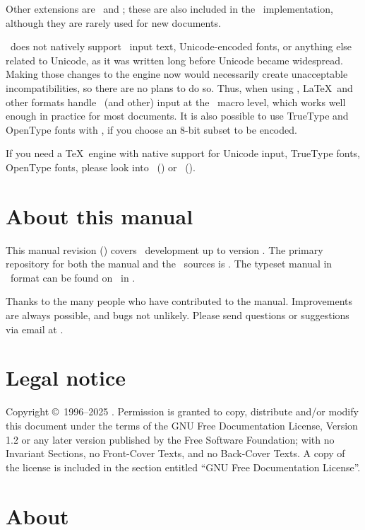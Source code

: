 \documentclass{pdftexmanual}
\begin{document}
Other extensions are \MLTEX\ and \ENCTEX; these are also included in the
\PDFTEX\ implementation, although they are rarely used for new documents.

\PDFTEX\ does not natively support \UTFEIGHT\ input text,
Unicode-encoded fonts, or anything else related to Unicode, as it was
written long before Unicode became widespread. Making those changes to
the engine now would necessarily create unacceptable incompatibilities,
so there are no plans to do so. Thus, when using \PDFTEX, \LaTeX\ and
other formats handle \UTFEIGHT\ (and other) input at the \TEX\ macro
level, which works well enough in practice for most documents. It is
also possible to use TrueType and OpenType fonts with \PDFTEX, if you
choose an 8-bit subset to be encoded.

If you need a \TeX\ engine with native support for Unicode input,
TrueType fonts, OpenType fonts, please look into \LUATEX\
() or \XETEX\ ().

\section{About this manual}

This manual revision (\rcsrevision) covers \PDFTEX\ development up to
version \currentpdftex. The primary repository for both the manual and
the \PDFTEX\ sources is \useurl{ptexdevel}. The typeset manual in \PDF\
format can be found on \CTAN\ in .

Thanks to the many people who have contributed to the manual.
Improvements are always possible, and bugs not unlikely.
Please send questions or suggestions via email at .

\section{Legal notice}

Copyright \copyright\ 1996--2025 \THANH.
Permission is granted to copy, distribute and/or modify this document
under the terms of the GNU Free Documentation License, Version 1.2
or any later version published by the Free Software Foundation;
with no Invariant Sections, no Front-Cover Texts, and no Back-Cover Texts.
A copy of the license is included in the section entitled ``GNU
Free Documentation License''.

\section{About \PDF}
\end{document}
